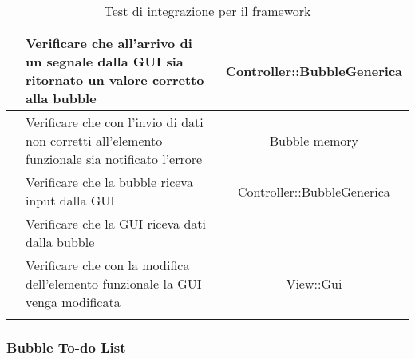 \begin{longtable}{|c|P{9cm}|c|}
	\hline {} & Verificare che all'arrivo di un segnale dalla GUI sia ritornato un valore corretto alla bubble & Controller::BubbleGenerica \\
	\hline {} & Verificare che con l'invio di dati non corretti all'elemento funzionale sia notificato l'errore & Bubble memory \\
	\hline {} & Verificare che la bubble riceva input dalla GUI & Controller::BubbleGenerica \\
	\hline {} & Verificare che la GUI riceva dati dalla bubble & \\
	\hline {} & Verificare che con la modifica dell'elemento funzionale la GUI venga modificata & View::Gui \\
	\hline
	\caption{Test di integrazione per il framework}
\end{longtable}

\subsubsection{Bubble To-do List}

